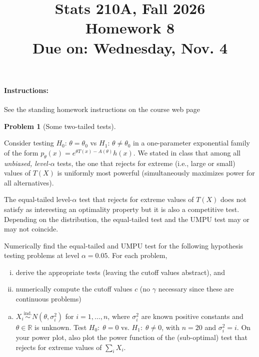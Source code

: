 \documentclass{article}
\newcommand{\RR}{\mathbb{R}}
\newcommand{\simind}{\overset{\text{ind.}}{\sim}}
\theoremstyle{definition}
\newtheorem{problem}{Problem}
\begin{document}
\title{Stats 210A, Fall 2026\\
  Homework 8 \\
  {\large {\bf Due on}: Wednesday, Nov. 4}}
\date{}

\maketitle

\paragraph{Instructions:} See the standing homework instructions on the course web page

\begin{problem}[Some two-tailed tests]
\label{prob:two-tailed}

Consider testing $H_0:\,\theta = \theta_0$ vs $H_1:\,\theta \neq \theta_0$ in a one-parameter exponential family of the form $p_\theta(x) = e^{\theta T(x) - A(\theta)}h(x)$. We stated in class that among all {\em unbiased, level-$\alpha$} tests, the one that rejects for extreme (i.e., large or small) values of $T(X)$ is uniformly most powerful (simultaneously maximizes power for all alternatives).

The equal-tailed level-$\alpha$ test that rejects for extreme values of $T(X)$ does not satisfy as interesting an optimality property but it is also a competitive test. Depending on the distribution, the equal-tailed test and the UMPU test may or may not coincide.

Numerically find the equal-tailed and UMPU test for the following hypothesis testing problems at level $\alpha=0.05$. For each problem,
\begin{enumerate}[(i)]
\item derive the appropriate tests (leaving the cutoff values abstract), and
\item numerically compute the cutoff values $c$ (no $\gamma$ necessary since these are continuous problems)
\end{enumerate}

\begin{enumerate}[(a)]

\item $X_i \simind N(\theta, \sigma_i^2)$ for $i=1,\ldots,n$, where $\sigma_i^2$ are known positive constants and $\theta \in \RR$ is unknown. Test $H_0:\; \theta = 0$ vs. $H_1:\; \theta \neq 0$, with $n = 20$ and $\sigma_i^2 = i$.  On your power plot, also plot the power function of the (sub-optimal) test that rejects for extreme values of $\sum_i X_i$.






\end{enumerate}
\end{problem}
\end{document}
